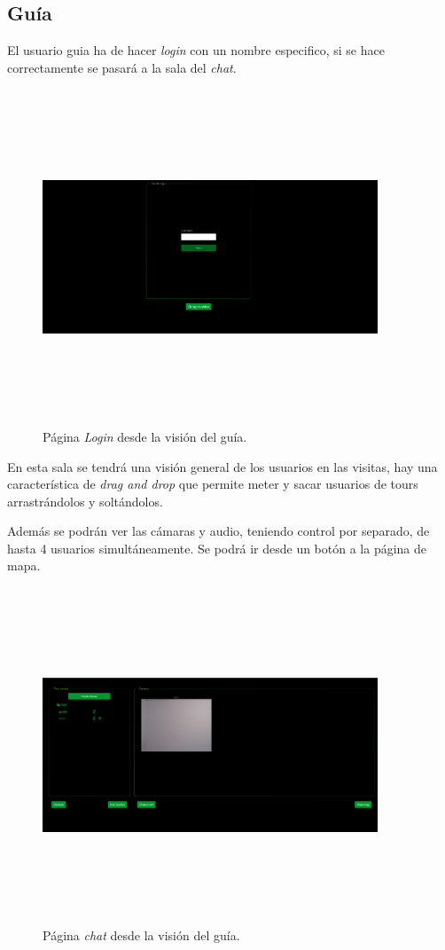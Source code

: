 \subsection{Guía}

El usuario guia ha de hacer \textit{login} con un nombre especifico, si se hace correctamente se pasará a la sala del \textit{chat}.
\FloatBarrier
\begin{figure}[h]
    \centering
    \includegraphics[width=10cm,height=10cm,keepaspectratio]{img/LoginGuide.png}
    \caption{Página \textit{Login} desde la visión del guía.}
    \label{fig:diagram_seceunce_guide}
\end{figure}
\FloatBarrier
En esta sala se tendrá una visión general de los usuarios en las visitas, hay una característica de \textit{drag and drop} que permite meter y sacar usuarios de tours arrastrándolos y soltándolos.


Además se podrán ver las cámaras y audio, teniendo control por separado, de hasta 4 usuarios simultáneamente. Se podrá ir desde un botón a la página de mapa.
\FloatBarrier
\begin{figure}[h]
    \centering
    \includegraphics[width=10cm,height=10cm,keepaspectratio]{img/GuideChatDesktop.png}
    \caption{Página \textit{chat} desde la visión del guía.}
    \label{fig:diagram_seceunce_guide}
\end{figure}
\FloatBarrier


